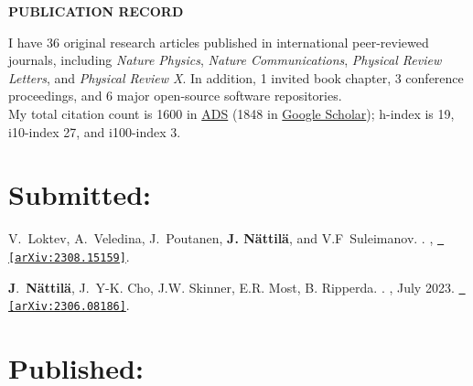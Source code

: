 \documentclass[letterpaper, onecolumn, 11pt]{article}
\begin{document}
\begin{center}
\textbf{PUBLICATION RECORD}
\end{center}

\noindent
I have 36 original research articles published in international peer-reviewed journals, including 
\textit{Nature Physics}, 
\textit{Nature Communications}, 
\textit{Physical Review Letters}, and 
\textit{Physical Review X}. 
In addition, 1 invited book chapter, 3 conference proceedings, and 6 major open-source software repositories.\\

\noindent
My total citation count is 1600 in \href{https://ui.adsabs.harvard.edu/search/q=%20author%3A%22nattila%22&sort=date%20desc%2C%20bibcode%20desc&p_=0}{ADS}
(1848 in \href{https://scholar.google.com/citations?user=d1fD9oYAAAAJ&hl=en}{Google Scholar}); 
h-index is 19, i10-index 27, and i100-index 3. 


\section*{Submitted:}
\vspace{-1cm}

\begin{thebibliography}{4}

V.~{Loktev}, 
A.~{Veledina},
J.~{Poutanen},
\textbf{J. {N{\"a}ttil{\"a}}}, 
and 
V.F~{Suleimanov}.
.
, 
\href{http://arxiv.org/abs/2308.15159}{\nolinkurl{ [arXiv:2308.15159]}}.

\textbf{J}.~{\textbf{N\"attil\"a}}, J.~Y-K. {Cho}, J.W. Skinner, E.R. Most, B. Ripperda.
.
, July 2023.
\href{http://arxiv.org/abs/2306.08186}{\nolinkurl{ [arXiv:2306.08186]}}.

\end{thebibliography}



\section*{Published:}
\vspace{-1cm}
\end{document}
